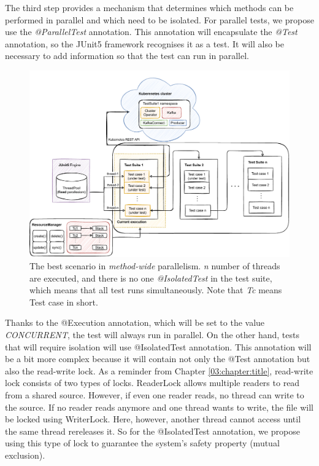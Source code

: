 The third step provides a mechanism that determines which methods can be performed in parallel and which need to be isolated.
For parallel tests, we propose use the \emph{@ParallelTest} annotation.
This annotation will encapsulate the \emph{@Test} annotation, so the JUnit5 framework recognises it as a test.
It will also be necessary to add information so that the test can run in parallel.
\begin{figure}[!ht]
    \centering
    \includegraphics[scale=0.7]{obrazky-figures/06-proposal-of-parallel-approach/03b-method-wide-with-resource-manager.pdf}
    \caption{The best scenario in \emph{method-wide} parallelism. \emph{n} number of threads are executed, and there is no one \emph{@IsolatedTest} in the test suite, which means that all test runs simultaneously. Note that \emph{Tc} means Test case in short.}
    \label{05:fig:methodwideparallelism}
\end{figure}
Thanks to the @Execution annotation, which will be set to the value \emph{CONCURRENT}, the test will always run in parallel.
On the other hand, tests that will require isolation will use @IsolatedTest annotation.
This annotation will be a bit more complex because it will contain not only the @Test annotation but also the read-write lock.
As a reminder from Chapter \ref{03:chapter:title}, read-write lock consists of two types of locks.
ReaderLock allows multiple readers to read from a shared source.
However, if even one reader reads, no thread can write to the source.
If no reader reads anymore and one thread wants to write, the file will be locked using WriterLock.
Here, however, another thread cannot access until the same thread rereleases it.
So for the @IsolatedTest annotation, we propose using this type of lock to guarantee the system's safety property (mutual exclusion).

